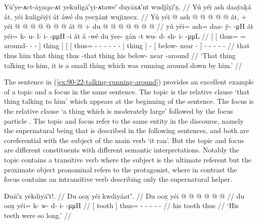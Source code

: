 \ex\label{ex:90-22-talking-running-around}%
%
\begingl
	\glpreamble	Yū′ye-ᴀct-āỵaqa-ᴀt yekułigā′ỵi-ᴀtawe′ duyāxᴀ′nt wudjîx̣ī′x̣. //
	\glpreamble	Yú yéi ash daaÿaḵá át, yéi kuligéiÿi át áwé du yeex̱ánt wujixeex. //
	\gla	{} Yú {} yéi @ ash @  @ {} @ {} @ {} @ {} {} át, {} +
		{} {} yéi @  @ {} @ {} @ {} @ {} @ {} @ {} {} át {}
		 @ {} +
		{} du  @ {} @ {} {}
		 @ {} @ {} @ {} @ {} @ {} //
	\glb	{} yú {} yéi= ash= daa- ÿ-  -μH {} {} át {}
		{} {} yéi= k- u- l- i-  -μμH -i {} át {}
		á -wé
		{} du ÿee- x̱án -t {}
		wu- d- sh- i-  -μμL //
	\glc	{}[  {}[ thus= = around- -  - \· {}]
			thing {}]
		{}[ {}[ thus= - - - -  - - {}]
			thing {}]
		 -
		{}[  below- near - {}]
		- - - -  - //
	\gld	{} that {} thus him  {} {} {} \·that {} thing {}
		{} {} thus  {} {} {} {} {} -that {} thing {}
		 {}
		{} his below- near -around {}
		 {} {} {} {} {} //
	\glft	‘That thing talking to him, it is a small thing which was running around down by him.’
		//
\endgl
\xe

The sentence in (\ref{ex:90-22-talking-running-around}) provides an excellent example of a topic and a focus in the same sentence.
The topic is the relative clause  ‘that thing talking to him’ which appears at the beginning of the sentence.
The focus is the relative clause  ‘a thing which is moderately large’ followed by the focus particle .
The topic and focus refer to the same entity in the discourse, namely the supernatural being that is described in the following sentences, and both are coreferential with the subject of the main verb  ‘it ran’.
But the topic and focus are different constituents with different semantic interpretations.
Notably the topic contains a transitive verb where the subject is the ultimate referent but the proximate object pronominal refers to the protagonist, where in contrast the focus contains an intransitive verb describing only the supernatural helper.

\ex\label{ex:90-23-tooth-long}%
%
\begingl
	\glpreamble	Duū′x yēkdiyā′t!. //
	\glpreamble	Du oox̱ yéi kwdiyáatʼ. //
	\gla	{} Du oox̱ {}
		yéi @  @ {} @ {} @ {} @ {} @ {} //
	\glb	{} du oox̱ {}
		yéi= k- w- d- i-  -μμH //
	\glc	{}[  tooth {}]
		thus= - - - -  - //
	\gld	{} his tooth {}
		thus  {} {} {} {} {} //
	\glft	‘His teeth were so long.’
		//
\endgl
\xe

